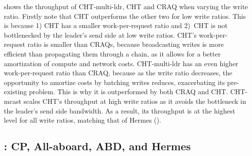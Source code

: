 


 shows the throughput of CHT-multi-ldr, CHT and CRAQ when varying the write ratio. Firstly note that CHT outperforms the other two for low write ratios.
This is because 1) CHT has a smaller work-per-request ratio and 2)~CHT is not bottlenecked by the leader's send side at low write ratios.
CHT's work-per-request ratio is smaller than CRAQs, because broadcasting writes is more efficient than propagating them through a chain, as it allows for a better amortization of compute and network costs.
CHT-multi-ldr has an even higher work-per-request ratio than CRAQ, because 
as the write ratio decreases, the opportunity to amortize costs by batching writes reduces, exacerbating its pre-existing problem. %
This is why it is outperformed by both CRAQ and CHT.
CHT-mcast scales CHT's throughput at high write ratios as it avoids the bottleneck in the leader's send side bandwidth.
As a result, its throughput is at the highest level for all write ratios, matching that of Hermes ().





\subsection{\DPKO: CP, All-aboard, ABD, and Hermes}\label{sec:ev:dpko}

